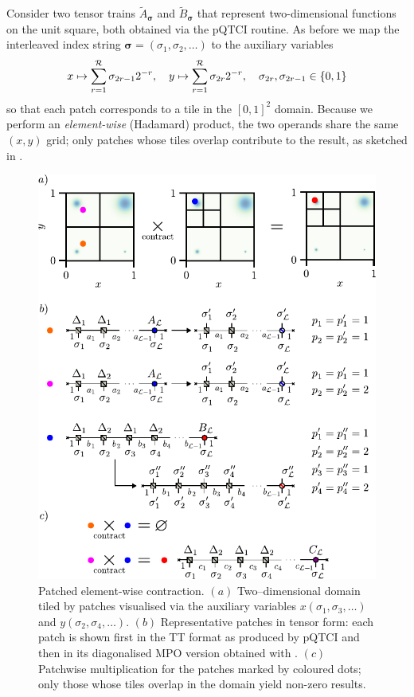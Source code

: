 Consider two tensor trains \(\widetilde{A}_{\boldsymbol{\sigma}}\) and \(\widetilde{B}_{\boldsymbol{\sigma}}\) that represent two-dimensional functions on the unit square, both obtained via the pQTCI routine.  
As before we map the interleaved index string
\(\boldsymbol{\sigma}=(\sigma_{1},\sigma_{2},\dots)\) to the auxiliary variables
\begin{equation}
    x \mapsto \sum_{r=1}^{\mathcal{R}}\sigma_{2r-1}2^{-r}, \quad y \mapsto \sum_{r=1}^{\mathcal{R}}\sigma_{2r}2^{-r}, \quad \sigma_{2r}, \sigma_{2r-1} \in \{0,1\}
\end{equation}
so that each patch corresponds to a tile in the \([0,1]^{2}\) domain.  
Because we perform an \emph{element-wise} (Hadamard) product, the two operands share the same \((x,y)\)  grid; only patches whose tiles overlap contribute to
the result, as sketched in . 
\begin{figure}
    \centering    
    \includegraphics{figures/PatchElemenContr.pdf}
    \caption{Patched element-wise contraction. $(a)$  Two–dimensional domain tiled by patches visualised via the auxiliary variables
    \(x(\sigma_{1},\sigma_{3},\dots)\) and
    \(y(\sigma_{2},\sigma_{4},\dots)\). $(b)$  Representative patches in tensor form: each patch is shown first in the TT format as produced by pQTCI and then in its diagonalised MPO version obtained with . $(c)$  Patchwise multiplication for the patches marked by coloured dots; only those whose tiles overlap in the domain yield non-zero results. } 
    \label{fig:patchElemContr}
\end{figure}

